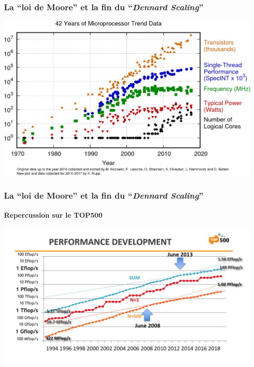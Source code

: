 \documentclass[xcolor={x11names,svgnames}]{beamer}
\begin{document}
\begin{frame}
  \frametitle{La ``loi de Moore'' et la fin du ``\textit{Dennard Scaling}''}

  \includegraphics[width=\textwidth]{42-years-processor-trend.jpg}
\end{frame}

\begin{frame}
  \frametitle{La ``loi de Moore'' et la fin du ``\textit{Dennard Scaling}''}

  \framesubtitle{Repercussion sur le TOP500}
  
  \includegraphics[width=\textwidth]{Top500-Dennard-scaling-effect.png}
\end{frame}
\end{document}
